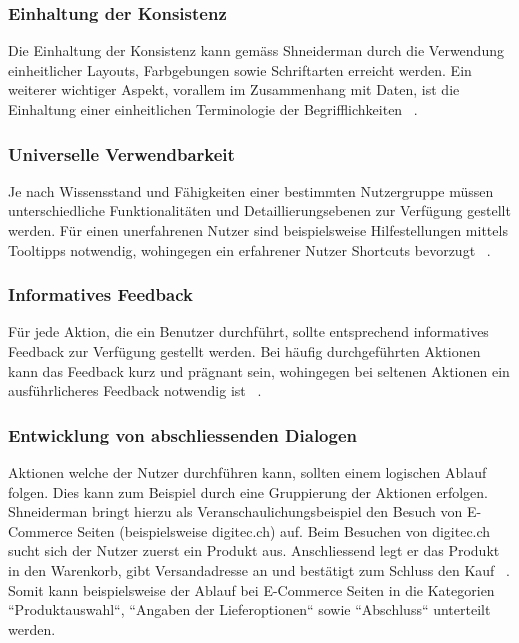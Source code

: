 \subsubsection{Einhaltung der Konsistenz}
Die Einhaltung der Konsistenz kann gemäss Shneiderman durch die Verwendung einheitlicher Layouts, Farbgebungen sowie Schriftarten erreicht werden. Ein weiterer wichtiger Aspekt, vorallem im Zusammenhang mit Daten, ist die Einhaltung einer einheitlichen Terminologie der Begrifflichkeiten ~\citep{shneiderman_golden_rules}.

\subsubsection{Universelle Verwendbarkeit}
Je nach Wissensstand und Fähigkeiten einer bestimmten Nutzergruppe müssen unterschiedliche Funktionalitäten und Detaillierungsebenen zur Verfügung gestellt werden. Für einen unerfahrenen Nutzer sind beispielsweise Hilfestellungen mittels Tooltipps notwendig, wohingegen ein erfahrener Nutzer Shortcuts bevorzugt ~\citep{shneiderman_golden_rules}.

\subsubsection{Informatives Feedback}
Für jede Aktion, die ein Benutzer durchführt, sollte entsprechend informatives Feedback zur Verfügung gestellt werden. Bei häufig durchgeführten Aktionen kann das Feedback kurz und prägnant sein, wohingegen bei seltenen Aktionen ein ausführlicheres Feedback notwendig ist ~\citep{shneiderman_golden_rules}.

\subsubsection{Entwicklung von abschliessenden Dialogen}
Aktionen welche der Nutzer durchführen kann, sollten einem logischen Ablauf folgen. Dies kann zum Beispiel durch eine Gruppierung der Aktionen erfolgen. Shneiderman bringt hierzu als Veranschaulichungsbeispiel den Besuch von E-Commerce Seiten (beispielsweise digitec.ch) auf. Beim Besuchen von digitec.ch sucht sich der Nutzer zuerst ein Produkt aus. Anschliessend legt er das Produkt in den Warenkorb, gibt Versandadresse an und bestätigt zum Schluss den Kauf ~\citep{shneiderman_golden_rules}. Somit kann beispielsweise der Ablauf bei E-Commerce Seiten in die Kategorien ``Produktauswahl``, ``Angaben der Lieferoptionen`` sowie ``Abschluss`` unterteilt werden.

